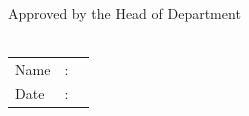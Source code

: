 \vspace{3\baselineskip}

\begin{minipage}[b]{.5\textwidth}
~
\end{minipage}%
\begin{minipage}[b]{.5\textwidth}
	\raggedleft
	
	Approved by the Head of Department\\
	{\bfseries\theprogramme} \\[2\baselineskip]
	
		\begin{tabular}{lcl}
		Name & : & \thehod	\\
		Date  & : &  \\
	\end{tabular}
\end{minipage}

\endgroup
\raggedbottom
\cleardoublepage
%
%  